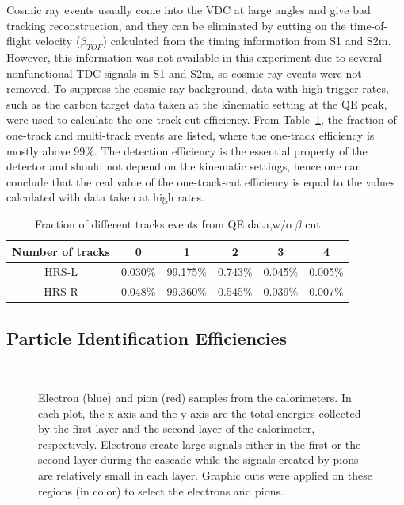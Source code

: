  Cosmic ray events usually come into the VDC at large angles and give bad tracking reconstruction, and they can be eliminated by cutting on the time-of-flight velocity ($\beta_{TOF}$) calculated from the timing information from S1 and S2m. However, this information was not available in this experiment due to several nonfunctional TDC signals in S1 and S2m, so cosmic ray events were not removed. To suppress the cosmic ray background, data with high trigger rates, such as the carbon target data taken at the kinematic setting at the QE peak, were used to calculate the one-track-cut efficiency. From Table~\ref{vdc_table}, the fraction of one-track and multi-track events are listed, where the one-track efficiency is mostly above 99\%. The detection efficiency is the essential property of the detector and should not depend on the kinematic settings, hence one can conclude that the real value of the one-track-cut efficiency is equal to the values calculated with data taken at high rates.
\begin{table}[!ht]
  \centering
  \begin{tabular}{|c||ccccc|}
    \hline
    \textbf{Number of tracks}  & 0 & 1 & 2 & 3 & 4     \\
    \hline \hline
    HRS-L   & 0.030\% & 99.175\% & 0.743\% & 0.045\% & 0.005\%  \\
    \hline
    HRS-R   & 0.048\% & 99.360\% & 0.545\% & 0.039\% & 0.007\%  \\
    \hline 
  \end{tabular}
  \caption{Fraction of different tracks events from QE data,w/o $\beta$ cut}
  \label{vdc_table}	
\end{table} 
\subsection{Particle Identification Efficiencies}
 \begin{figure}[!ht]
  \begin{center}
    \\
    \caption[Electron and pion samples from the calorimeters]{\footnotesize{Electron (blue) and pion (red) samples from the calorimeters. In each plot, the x-axis and the y-axis are the total energies collected by the first layer and the second layer of the calorimeter, respectively. Electrons create large signals either in the first or the second layer during the cascade while the signals created by pions are relatively small in each layer. Graphic cuts were applied on these regions (in color) to select the electrons and pions. } }
    \label{calo_sample}
  \end{center}
\end{figure}

